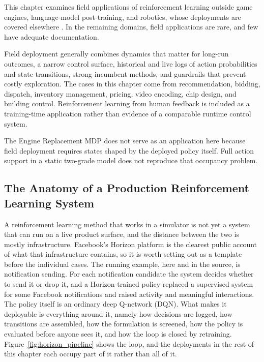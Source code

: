 This chapter examines field applications of reinforcement learning outside game engines, language-model post-training, and robotics, whose deployments are covered elsewhere \citep{Shao2019VideoGamesSurvey,Kaufmann2023RLHFSurvey,Ibarz2021robot,Tang2024RoboticsSurvey}. In the remaining domains, field applications are rare, and few have adequate documentation.

Field deployment generally combines dynamics that matter for long-run outcomes, a narrow control surface, historical and live logs of action probabilities and state transitions, strong incumbent methods, and guardrails that prevent costly exploration. The cases in this chapter come from recommendation, bidding, dispatch, inventory management, pricing, video encoding, chip design, and building control. Reinforcement learning from human feedback is included as a training-time application rather than evidence of a comparable runtime control system.

The Engine Replacement MDP does not serve as an application here because field deployment requires states shaped by the deployed policy itself. Full action support in a static two-grade model does not reproduce that occupancy problem.

\subsection{The Anatomy of a Production Reinforcement Learning System}
\label{subsec:production_rl_anatomy}

A reinforcement learning method that works in a simulator is not yet a system that can run on a live product surface, and the distance between the two is mostly infrastructure. Facebook's Horizon platform \citep{Gauci2019Horizon} is the clearest public account of what that infrastructure contains, so it is worth setting out as a template before the individual cases. The running example, here and in the source, is notification sending. For each notification candidate the system decides whether to send it or drop it, and a Horizon-trained policy replaced a supervised system for some Facebook notifications and raised activity and meaningful interactions. The policy itself is an ordinary deep Q-network (DQN). What makes it deployable is everything around it, namely how decisions are logged, how transitions are assembled, how the formulation is screened, how the policy is evaluated before anyone sees it, and how the loop is closed by retraining. Figure~\ref{fig:horizon_pipeline} shows the loop, and the deployments in the rest of this chapter each occupy part of it rather than all of it.

